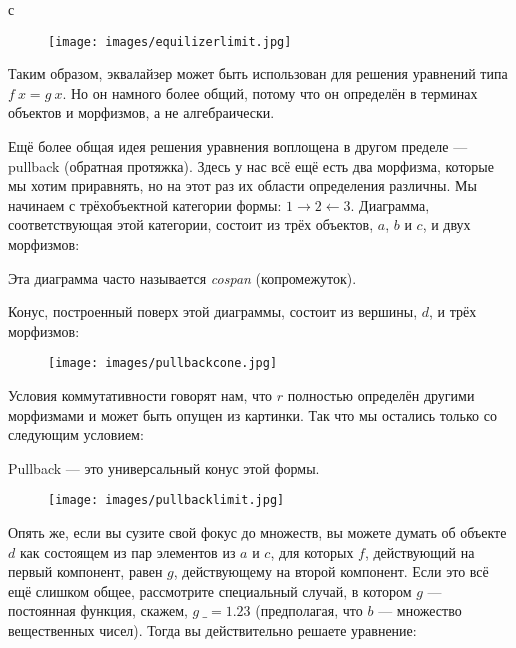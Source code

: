 
с


\begin{figure}[H]
  \centering
  \texttt{[image: images/equilizerlimit.jpg]}
\end{figure}

\noindent
Таким образом, эквалайзер может быть использован для решения уравнений типа
$f~x = g~x$. Но он намного более общий, потому что он определён
в терминах объектов и морфизмов, а не алгебраически.

Ещё более общая идея решения уравнения воплощена в другом
пределе --- pullback (обратная протяжка). Здесь у нас всё ещё есть два морфизма, которые мы хотим
приравнять, но на этот раз их области определения различны. Мы начинаем с
трёхобъектной категории формы:
$1\rightarrow2\leftarrow3$. Диаграмма, соответствующая
этой категории, состоит из трёх объектов, $a$, $b$ и
$c$, и двух морфизмов:


Эта диаграмма часто называется \emph{cospan} (копромежуток).

Конус, построенный поверх этой диаграммы, состоит из вершины, $d$,
и трёх морфизмов:


\begin{figure}[H]
  \centering
  \texttt{[image: images/pullbackcone.jpg]}
\end{figure}

\noindent
Условия коммутативности говорят нам, что $r$ полностью
определён другими морфизмами и может быть опущен из картинки.
Так что мы остались только со следующим условием:

Pullback --- это универсальный конус этой формы.

\begin{figure}[H]
  \centering
  \texttt{[image: images/pullbacklimit.jpg]}
\end{figure}

\noindent
Опять же, если вы сузите свой фокус до множеств, вы можете думать об
объекте $d$ как состоящем из пар элементов из $a$ и
$c$, для которых $f$, действующий на первый компонент, равен
$g$, действующему на второй компонент. Если это всё ещё слишком
общее, рассмотрите специальный случай, в котором $g$ --- постоянная
функция, скажем, $g~\_ = 1.23$ (предполагая, что $b$ --- множество
вещественных чисел). Тогда вы действительно решаете уравнение:

